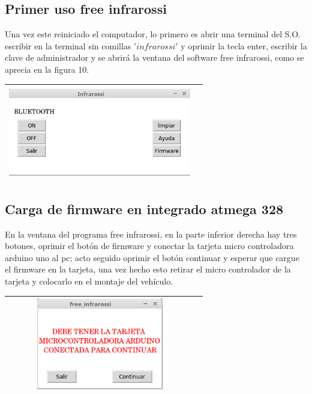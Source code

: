 \documentclass[12]{article}
\newenvironment{Figure}
{\par\medskip\noindent\minipage{\linewidth}}
{\endminipage\par\medskip}
\begin{document}
\begin{multicols}{2}
\subsection{Primer uso free infrarossi}

Una vez este reiniciado el computador, lo primero  es abrir una terminal del S.O. escribir en la terminal sin comillas $'infrarossi'$ y oprimir la tecla enter, escribir la clave de administrador y se abrirá la ventana del software free infrarossi, como se aprecia en la figura 10.
\begin{Figure}	
\center
\begin{tabular}{|l|r|}
\hline
\includegraphics[width=8cm, height=4cm]{img/infrarossi.png} \\ \hline
\end{tabular}
\label{fig:g10}
\end{Figure}


\subsection{Carga de firmware en integrado atmega 328}
En la ventana del programa free infrarossi, en la parte inferior derecha hay tres botones, oprimir el botón de firmware y conectar la tarjeta micro controladora arduino uno al pc; acto seguido oprimir el botón continuar y esperar que cargue el firmware en la tarjeta, una vez hecho esto retirar el micro controlador de la tarjeta y colocarlo en el montaje del vehículo.
\begin{Figure}	
\center
\begin{tabular}{|l|r|}
\hline
\includegraphics[width=8cm, height=4cm]{img/firmware.png} \\ \hline
\end{tabular}
\label{fig:g11}
\end{Figure}



\end{multicols}
\end{document}
